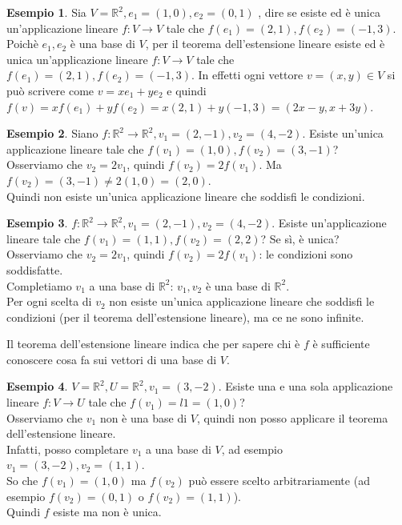 \documentclass[a4paper]{article}
\theoremstyle{definition}
\newtheorem*{es}{Esempio}
\begin{document}
\begin{es}
	Sia $V = \mathbb{R}^2, e_1 = (1, 0), e_2 = (0, 1)$ , dire se esiste ed è unica un'applicazione lineare $f: V \rightarrow V$ tale che $f(e_1) = (2, 1), f(e_2) = (-1, 3)$. \\
	Poichè $e_1, e_2$ è una base di $V$, per il teorema dell'estensione lineare esiste ed è unica un'applicazione lineare $f: V \rightarrow V$ tale che $f(e_1) = (2, 1), f(e_2) = (-1, 3)$.
	In effetti ogni vettore $v = (x, y) \in V$ si può scrivere come $v = xe_1 + ye_2$ e quindi $f(v) = xf(e_1) + yf(e_2) = x(2, 1) + y(-1, 3) = (2x - y, x + 3y)$.
\end{es}
\begin{es}
	Siano $f: \mathbb{R}^2 \rightarrow \mathbb{R}^2, v_1 = (2, -1), v_2 = (4, -2)$.
	Esiste un'unica applicazione lineare tale che $f(v_1) = (1, 0), f(v_2) = (3, -1)$? \\
	Osserviamo che $v_2 = 2v_1$, quindi $f(v_2) = 2f(v_1)$. Ma $f(v_2) = (3, -1) \neq 2(1, 0) = (2, 0)$. \\
	Quindi non esiste un'unica applicazione lineare che soddisfi le condizioni.
\end{es}
\begin{es}
	$f: \mathbb{R}^2 \rightarrow \mathbb{R}^2, v_1 = (2, -1), v_2 = (4, -2)$.
	Esiste un'applicazione lineare tale che $f(v_1) = (1, 1), f(v_2) = (2, 2)$? Se sì, è unica? \\
	Osserviamo che $v_2 = 2v_1$, quindi $f(v_2) = 2f(v_1)$: le condizioni sono soddisfatte. \\
	Completiamo $v_1$ a una base di $\mathbb{R}^2$: $v_1, v_2$ è una base di $\mathbb{R}^2$. \\
	Per ogni scelta di $v_2$ non esiste un'unica applicazione lineare che soddisfi le condizioni (per il teorema dell'estensione lineare), ma ce ne sono infinite.
\end{es}

Il teorema dell'estensione lineare indica che per sapere chi è $f$ è sufficiente conoscere cosa fa sui vettori di una base di $V$.

\begin{es}
	$V = \mathbb{R}^2, U = \mathbb{R}^2, v_1 = (3, -2)$. Esiste una e una sola applicazione lineare $f: V \rightarrow U$ tale che $f(v_1) = l1 = (1, 0)$? \\
	Osserviamo che $v_1$ non è una base di $V$, quindi non posso applicare il teorema dell'estensione lineare. \\
	Infatti, posso completare $v_1$ a una base di $V$, ad esempio $v_1 = (3, -2), v_2 = (1, 1)$. \\
	So che $f(v_1) = (1, 0)$ ma $f(v_2)$ può essere scelto arbitrariamente (ad esempio $f(v_2) = (0, 1)$ o $f(v_2) = (1, 1)$). \\
	Quindi $f$ esiste ma non è unica.
\end{es}
\end{document}
